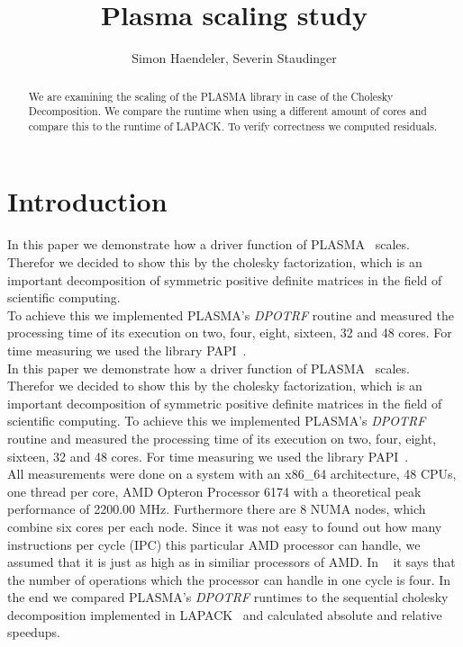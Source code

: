 \documentclass[a4paper,final,ngerman,english]{article}
\begin{document}
\lstset{postbreak=\space,breakindent=5pt,breaklines,basicstyle=\scriptsize,frame=trbl,label=DescriptiveLabel} %
\pagestyle{headings}
%
\title{Plasma scaling study}
\author{Simon Haendeler, Severin Staudinger}
\maketitle
%
\begin{abstract}
	We are examining the scaling of the PLASMA library in case of the Cholesky Decomposition.
	We compare the runtime when using a different amount of cores and compare this to the runtime
	of LAPACK\@. To verify correctness we computed residuals. 
\end{abstract}
\section{Introduction}
In this paper we demonstrate how a driver function of PLASMA~\cite{plasma01} scales.
Therefor we decided to show this by the cholesky factorization, which is an important decomposition of symmetric positive definite matrices in the field of scientific computing.\\
To achieve this we implemented PLASMA's \textit{DPOTRF} routine and measured the processing time of its execution on two, four, eight, sixteen, 32 and 48 cores. For time measuring we used the library PAPI~\cite{papi02}.\\
In this paper we demonstrate how a driver function of PLASMA~\cite{YarKhan2016} scales.
Therefor we decided to show this by the cholesky factorization, which is an important decomposition of symmetric positive definite matrices in the field of scientific computing.
To achieve this we implemented PLASMA's \textit{DPOTRF} routine and measured the processing time of its execution on two, four, eight, sixteen, 32 and 48 cores. For time measuring we used the library PAPI~\cite{icl:59}.\\
All measurements were done on a system with an x86\_64 architecture, 48 CPUs, one thread per core, AMD Opteron\texttrademark{} Processor 6174 with a theoretical peak performance of 2200.00 MHz. Furthermore there are 8 NUMA nodes, which combine six cores per each node.
Since it was not easy to found out how many instructions per cycle (IPC) this particular AMD processor can handle, we assumed that it is just as high as in similiar processors of AMD. In ~\cite{amd05} it says that the number of operations which the processor can handle in one cycle is four.
In the end we compared PLASMA's \textit{DPOTRF} runtimes to the sequential cholesky decomposition implemented in LAPACK~\cite{lapack03} and calculated absolute and relative speedups.
\end{document}
